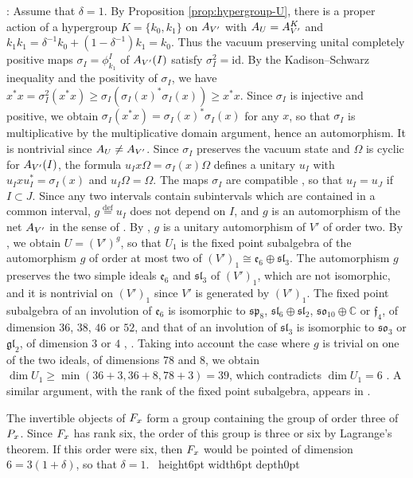 \documentclass[leqno]{article}
\newcommand{\Cbb}{\ensuremath{\mathbb{C}}}
\let\cal\relax
\newcommand{\cal}{\mathcal}
\renewcommand{\geq}{\ensuremath{\geqslant}}
\newcommand{\qed}{\hfill \vrule height6pt  width6pt depth0pt}
\newcommand{\ov}{\overset}
\newenvironment{proof}[1][]{\noindent {\it Proof #1} : }{\hbox{~}\qed
\smallskip
}
\numberwithin{equation}{section}
\begin{document}
\begin{proof}
Assume that $\delta = 1$. By Proposition \ref{prop:hypergroup-U}, there is a proper action of a hypergroup $K = \{k_0,k_1\}$ on $\cal A_{V'}$ with $\cal A_U = \cal A_{V'}^K$ and $k_1k_1 = \delta^{-1}k_0+(1-\delta^{-1})k_1 = k_0$. Thus the vacuum preserving unital completely positive maps $\sigma_I = \phi^I_{k_1}$ of $\cal A_{V'}(I)$ satisfy $\sigma_I^2 = \mathrm{id}$. By the Kadison--Schwarz inequality and the positivity of $\sigma_I$, we have $x^*x = \sigma_I^2(x^*x) \geq \sigma_I(\sigma_I(x)^*\sigma_I(x)) \geq x^*x$. Since $\sigma_I$ is injective and positive, we obtain $\sigma_I(x^*x) = \sigma_I(x)^*\sigma_I(x)$ for any $x$, so that $\sigma_I$ is multiplicative by the multiplicative domain argument, hence an automorphism. It is nontrivial since $\cal A_U \neq \cal A_{V'}$. Since $\sigma_I$ preserves the vacuum state and $\Omega$ is cyclic for $\cal A_{V'}(I)$, the formula $u_I x\Omega = \sigma_I(x)\Omega$ defines a unitary $u_I$ with $u_I x u_I^* = \sigma_I(x)$ and $u_I\Omega = \Omega$. The maps $\sigma_I$ are compatible \cite[Proposition 4.21 p.~23]{Bis17b}, so that $u_I = u_J$ if $I \subset J$. Since any two intervals contain subintervals which are contained in a common interval, $g \ov{\mathrm{def}}{=} u_I$ does not depend on $I$, and $g$ is an automorphism of the net $\cal A_{V'}$ in the sense of \cite[(41) p.~21]{CKLW18}. By \cite[Theorem 6.9 p.~53]{CKLW18}, $g$ is a unitary automorphism of $V'$ of order two. By \cite[Proposition 7.6 and Theorem 7.5 p.~58]{CKLW18}, we obtain $U = (V')^g$, so that $U_1$ is the fixed point subalgebra of the automorphism $g$ of order at most two of $(V')_1 \cong \mathfrak e_6 \oplus \mathfrak{sl}_3$. The automorphism $g$ preserves the two simple ideals $\mathfrak e_6$ and $\mathfrak{sl}_3$ of $(V')_1$, which are not isomorphic, and it is nontrivial on $(V')_1$ since $V'$ is generated by $(V')_1$. The fixed point subalgebra of an involution of $\mathfrak e_6$ is isomorphic to $\mathfrak{sp}_8$, $\mathfrak{sl}_6 \oplus \mathfrak{sl}_2$, $\mathfrak{so}_{10} \oplus \Cbb$ or $\mathfrak f_4$, of dimension $36$, $38$, $46$ or $52$, and that of an involution of $\mathfrak{sl}_3$ is isomorphic to $\mathfrak{so}_3$ or $\mathfrak{gl}_2$, of dimension $3$ or $4$ \cite[Chapter 8]{Kac90}, \cite[Chapter X]{Hel78}. Taking into account the case where $g$ is trivial on one of the two ideals, of dimensions $78$ and $8$, we obtain $\dim U_1 \geq \min(36+3,36+8,78+3) = 39$, which contradicts $\dim U_1 = 6$ \cite[Theorem 7.1]{Arh26}. A similar argument, with the rank of the fixed point subalgebra, appears in \cite[pp.~7--8]{Hua26}.

The invertible objects of $\cal F_x$ form a group containing the group of order three of $\cal P_x$. Since $\cal F_x$ has rank six, the order of this group is three or six by Lagrange's theorem. If this order were six, then $\cal F_x$ would be pointed of dimension $6 = 3(1+\delta)$, so that $\delta = 1$.
\end{proof}
\end{document}
